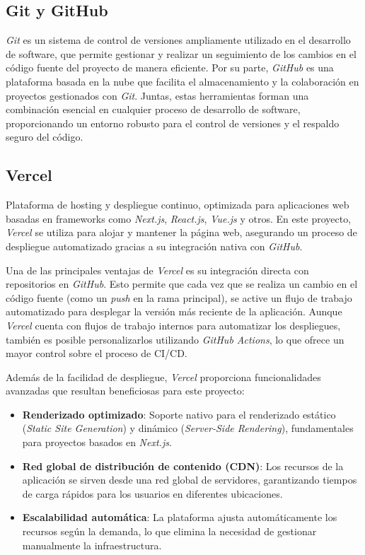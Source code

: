 \subsection{Git y GitHub}
\textit{Git} es un sistema de control de versiones ampliamente utilizado en el desarrollo de software, que permite gestionar y realizar un seguimiento de los cambios en el código fuente del proyecto de manera eficiente. Por su parte, \textit{GitHub} es una plataforma basada en la nube que facilita el almacenamiento y la colaboración en proyectos gestionados con \textit{Git}. Juntas, estas herramientas forman una combinación esencial en cualquier proceso de desarrollo de software, proporcionando un entorno robusto para el control de versiones y el respaldo seguro del código.

\subsection{Vercel}
Plataforma de hosting y despliegue continuo, optimizada para aplicaciones web basadas en frameworks como \textit{Next.js}, \textit{React.js}, \textit{Vue.js} y otros. En este proyecto, \textit{Vercel} se utiliza para alojar y mantener la página web, asegurando un proceso de despliegue automatizado gracias a su integración nativa con \textit{GitHub}.

Una de las principales ventajas de \textit{Vercel} es su integración directa con repositorios en \textit{GitHub}. Esto permite que cada vez que se realiza un cambio en el código fuente (como un \textit{push} en la rama principal), se active un flujo de trabajo automatizado para desplegar la versión más reciente de la aplicación. Aunque \textit{Vercel} cuenta con flujos de trabajo internos para automatizar los despliegues, también es posible personalizarlos utilizando \textit{GitHub Actions}, lo que ofrece un mayor control sobre el proceso de CI/CD.

Además de la facilidad de despliegue, \textit{Vercel} proporciona funcionalidades avanzadas que resultan beneficiosas para este proyecto:
\begin{itemize}
    \item \textbf{Renderizado optimizado}: Soporte nativo para el renderizado estático (\textit{Static Site Generation}) y dinámico (\textit{Server-Side Rendering}), fundamentales para proyectos basados en \textit{Next.js}.
    \item \textbf{Red global de distribución de contenido (CDN)}: Los recursos de la aplicación se sirven desde una red global de servidores, garantizando tiempos de carga rápidos para los usuarios en diferentes ubicaciones.
    \item \textbf{Escalabilidad automática}: La plataforma ajusta automáticamente los recursos según la demanda, lo que elimina la necesidad de gestionar manualmente la infraestructura.
\end{itemize}

